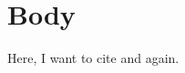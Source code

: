\documentclass[./main]{subfiles}
\begin{document}
\section{Body}

Here, I want to cite \citet{pikettyDistributionalNationalAccounts2018b} 
and \citet{chettyAreMicroMacro2011} again.

\end{document}
